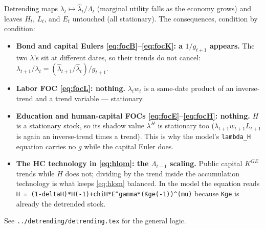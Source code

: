 \documentclass[11pt]{article}
\begin{document}
Detrending maps $\lambda_t \mapsto \hat\lambda_t/\Lambda_t$ (marginal utility
falls as the economy grows) and leaves $H_t$, $L_t$, and $E_t$ untouched (all
stationary). The consequences, condition by condition:
\begin{itemize}
    \item \textbf{Bond and capital Eulers \eqref{eq:focB}--\eqref{eq:focK}: a
    $1/g_{t+1}$ appears.} The two $\lambda$'s sit at different dates, so their
    trends do not cancel: $\lambda_{t+1}/\lambda_t =
    (\hat\lambda_{t+1}/\hat\lambda_t)/g_{t+1}$.
    \item \textbf{Labor FOC \eqref{eq:focL}: nothing.} $\lambda_t w_t$ is a
    same-date product of an inverse-trend and a trend variable --- stationary.
    \item \textbf{Education and human-capital FOCs
    \eqref{eq:focE}--\eqref{eq:focH}: nothing.} $H$ is a stationary stock, so its
    shadow value $\lambda^{H}$ is stationary too ($\lambda_{t+1}w_{t+1}L_{t+1}$
    is again an inverse-trend times a trend). This is why the model's
    \texttt{lambda\_H} equation carries no $g$ while the capital Euler does.
    \item \textbf{The HC technology in \eqref{eq:hlom}: the $\Lambda_{t-1}$
    scaling.} Public capital $K^{GE}$ trends while $H$ does not; dividing by the
    trend inside the accumulation technology is what keeps \eqref{eq:hlom}
    balanced. In the model the equation reads \texttt{H =
    (1-deltaH)*H(-1)+chiH*E\^{}gamma*(Kge(-1))\^{}(mu)} because \texttt{Kge} is
    already the detrended stock.
\end{itemize}
See \texttt{../detrending/detrending.tex} for the general logic.
\end{document}
